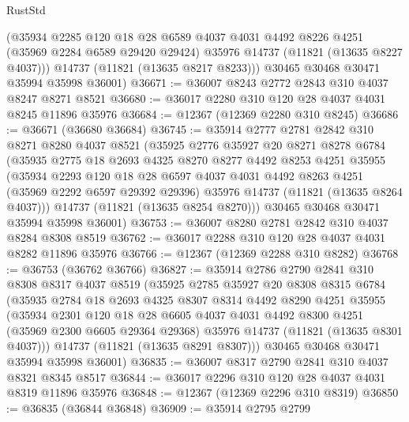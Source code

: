 \begin{lexlean}{RustStd}
\begin{coremodule}
        (@35934
          @2285
          @120
          @18
          @28
          @6589
          @4037
          @4031
          @4492
          @8226
          @4251
          (@35969 @2284 @6589 @29420 @29424)
          @35976
          @14737
          (@11821 (@13635 @8227 @4037)))
        @14737
        (@11821 (@13635 @8217 @8233)))
      @30465
      @30468
      @30471
      @35994
      @35998
      @36001)
@36671 := @36007 @8243 @2772 @2843 @310 @4037 @8247 @8271 @8521
@36680 := @36017 @2280 @310 @120 @28 @4037 @4031 @8245 @11896 @35976
@36684 := @12367 (@12369 @2280 @310 @8245)
@36686 := @36671 (@36680 @36684)
@36745 := @35914
    @2777
    @2781
    @2842
    @310
    @8271
    @8280
    @4037
    @8521
    (@35925
      @2776
      @35927
      @20
      @8271
      @8278
      @6784
      (@35935
        @2775
        @18
        @2693
        @4325
        @8270
        @8277
        @4492
        @8253
        @4251
        @35955
        (@35934
          @2293
          @120
          @18
          @28
          @6597
          @4037
          @4031
          @4492
          @8263
          @4251
          (@35969 @2292 @6597 @29392 @29396)
          @35976
          @14737
          (@11821 (@13635 @8264 @4037)))
        @14737
        (@11821 (@13635 @8254 @8270)))
      @30465
      @30468
      @30471
      @35994
      @35998
      @36001)
@36753 := @36007 @8280 @2781 @2842 @310 @4037 @8284 @8308 @8519
@36762 := @36017 @2288 @310 @120 @28 @4037 @4031 @8282 @11896 @35976
@36766 := @12367 (@12369 @2288 @310 @8282)
@36768 := @36753 (@36762 @36766)
@36827 := @35914
    @2786
    @2790
    @2841
    @310
    @8308
    @8317
    @4037
    @8519
    (@35925
      @2785
      @35927
      @20
      @8308
      @8315
      @6784
      (@35935
        @2784
        @18
        @2693
        @4325
        @8307
        @8314
        @4492
        @8290
        @4251
        @35955
        (@35934
          @2301
          @120
          @18
          @28
          @6605
          @4037
          @4031
          @4492
          @8300
          @4251
          (@35969 @2300 @6605 @29364 @29368)
          @35976
          @14737
          (@11821 (@13635 @8301 @4037)))
        @14737
        (@11821 (@13635 @8291 @8307)))
      @30465
      @30468
      @30471
      @35994
      @35998
      @36001)
@36835 := @36007 @8317 @2790 @2841 @310 @4037 @8321 @8345 @8517
@36844 := @36017 @2296 @310 @120 @28 @4037 @4031 @8319 @11896 @35976
@36848 := @12367 (@12369 @2296 @310 @8319)
@36850 := @36835 (@36844 @36848)
@36909 := @35914
    @2795
    @2799

\end{coremodule}
\end{lexlean}
